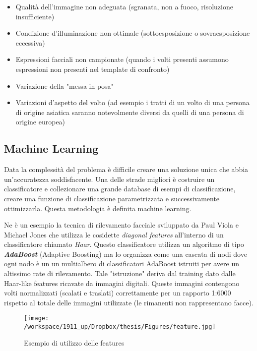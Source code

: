 \begin{itemize}
\item Qualità dell'immagine non adeguata (sgranata, non a fuoco, risoluzione insufficiente)
\item Condizione d'illuminazione non ottimale (sottoesposizione o sovraesposizione eccessiva)
\item Espressioni facciali non campionate (quando i volti presenti assumono espressioni non presenti nel template di confronto)
\item Variazione della "messa in posa"
\item Variazioni d'aspetto del volto (ad esempio i tratti di un volto di una persona di origine asiatica saranno notevolmente diversi da quelli di una persona di origine europea)
\end{itemize}

\subsection{Machine Learning}

Data la complessità del problema è difficile creare una soluzione unica che abbia un'accuratezza soddisfacente. Una delle strade migliori è costruire un classificatore e collezionare una grande database di esempi di classificazione, creare una funzione di classificazione parametrizzata e successivamente ottimizzarla. Questa metodologia è definita machine learning. 

Ne è un esempio la tecnica di rilevamento facciale sviluppato da Paul Viola e Michael Jones che utilizza le cosidette \textit{diagonal features} all'interno di un classificatore chiamato \textit{Haar}. Questo classificatore utilizza un algoritmo di tipo \textbf{\textit{AdaBoost}} (Adaptive Boosting) ma lo organizza come una cascata di nodi dove ogni nodo è un un multialbero di classificatori AdaBoost istruiti per avere un altissimo rate di rilevamento. Tale "istruzione" deriva dal training dato dalle Haar-like features ricavate da immagini digitali. Queste immagini contengono volti normalizzati (scalati e traslati) correttamente per un rapporto 1:6000 rispetto al totale delle immagini utilizzate (le rimanenti non rappresentano facce).


\begin{figure}[H]\centering  
\texttt{[image: /workspace/1911\_up/Dropbox/thesis/Figures/feature.jpg]}
\caption[Esempio di utilizzo delle features]{Esempio di utilizzo delle features}
\label{pic-a}
\end{figure}

